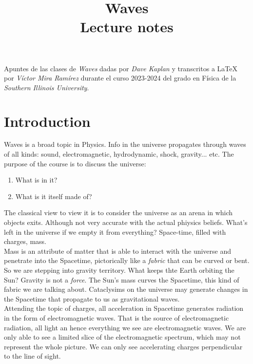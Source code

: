 \documentclass{report}
\title{\Huge{Waves\\Lecture notes}}
\author{}
\date{\number\year}
\begin{document}
\maketitle
\clearpage
\noindent Apuntes de las clases de \textit{Waves} dadas por \textit{Dave Kaplan} y transcritos a \LaTeX
\hspace{0cm} por \textit{Víctor Mira Ramírez} durante el curso 2023-2024 del grado en Física de la \textit{Southern Illinois University}.
\pagebreak
\tableofcontents
\pagebreak

\chapter{Introduction}
  \noindent Waves is a broad topic in Physics. Info in the universe propagates through waves of all kinds: sound, electromagnetic, hydrodynamic, shock, gravity... etc. The purpose of the course is to discuss the universe:
  \begin{enumerate}
    \item What is in it?
    \item What is it itself made of?
  \end{enumerate}
  \noindent The classical view to view it is to consider the universe as an arena in which objects exits. Although not very accurate with the actual phiysics beliefs.
  \noindent What's left in the universe if we empty it from everything? Space-time, filled with charges, mass.\\

  \noindent Mass is an attribute of matter that is able to interact with the universe and penetrate into the Spacetime, pictorically like a \textit{fabric} that can be curved or bent. So we are stepping into gravity territory. 
  What keeps thte Earth orbiting the Sun? Gravity is not a \textit{force}. The Sun's mass curves the Spacetime, this kind of fabric we are talking about. Cataclysims on the universe may generate changes
  in the Spacetime that propagate to us as gravitational waves.\\

  \noindent Attending the topic of charges, all acceleration in Spacetime generates radiation in the form of electromagnetic waves. That is the source of electromagnetic radiation, all light an hence everything we see are electromagnetic waves.
  We are only able to see a limited slice of the electromagnetic spectrum, which may not represent the whole picture. We can only see accelerating charges perpendicular to the line of sight.\\
\end{document}
